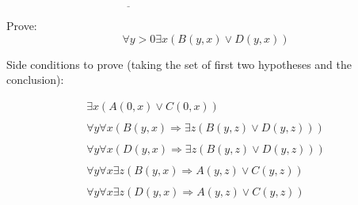 \vspace{-1mm}
$\underline{\qquad\qquad\qquad\qquad\qquad\qquad\qquad\qquad\qquad\qquad\qquad}$

Prove: 
\[\forall y > 0  \exists x (B(y,x) \lor D(y,x)) \]
 
Side conditions to prove (taking the set of first two hypotheses and the
conclusion):

\[\begin{array}{l}
\exists x (A(0,x) \lor C(0,x))\\
\\
\forall y \forall x (B(y,x) \Rightarrow  \exists z (B(y,z) \lor D(y,z))) \\
\\
\forall y \forall x (D(y,x) \Rightarrow  \exists z (B(y,z) \lor D(y,z))) \\
\\
\forall y \forall x \exists z (B(y,x) \Rightarrow A(y,z) \lor C(y,z)) \\
\\
\forall y \forall x \exists z (D(y,x) \Rightarrow A(y,z) \lor C(y,z)) \\
\end{array}\]